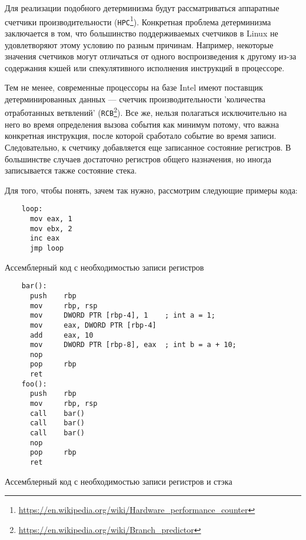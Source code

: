 Для реализации подобного детерминизма будут рассматриваться аппаратные счетчики производительности 
(\texttt{HPC}\footnote{\url{https://en.wikipedia.org/wiki/Hardware_performance_counter}}).
Конкретная проблема детерминизма заключается в том, что большинство поддерживаемых счетчиков в Linux 
не удовлетворяют этому условию по разным причинам. 
Например, некоторые значения счетчиков могут отличаться от одного воспроизведения к другому 
из-за содержания кэшей или спекулятивного исполнения инструкций в процессоре.

Тем не менее, современные процессоры на базе Intel имеют поставщик детерминированных данных — счетчик производительности 
'количества отработанных ветвлений'
(\texttt{RCB}\footnote{\url{https://en.wikipedia.org/wiki/Branch_predictor}}). 
Все же, нельзя полагаться исключительно на него во время определения вызова события как 
минимум потому, что важна конкретная инструкция, после которой сработало событие во время записи. 
Следовательно, к счетчику добавляется еще 
записанное состояние регистров. 
В большинстве случаев достаточно регистров общего назначения, но иногда записывается также состояние стека. 

Для того, чтобы понять, зачем так нужно, рассмотрим следующие примеры кода:

\begin{codelisting}[H]
  \begin{verbatim}
    loop:
      mov eax, 1
      mov ebx, 2
      inc eax
      jmp loop
  \end{verbatim}
  \caption{Ассемблерный код с необходимостью записи регистров}
  \label{lst:good-loop}
\end{codelisting}

\begin{codelisting}[H]
  \begin{verbatim}
    bar():
      push    rbp
      mov     rbp, rsp
      mov     DWORD PTR [rbp-4], 1    ; int a = 1;
      mov     eax, DWORD PTR [rbp-4]
      add     eax, 10
      mov     DWORD PTR [rbp-8], eax  ; int b = a + 10;
      nop
      pop     rbp
      ret
    foo():
      push    rbp
      mov     rbp, rsp
      call    bar()
      call    bar()
      call    bar()
      nop
      pop     rbp
      ret
  \end{verbatim}
  \caption{Ассемблерный код с необходимостью записи регистров и стэка}
  \label{lst:multiple-calls}
\end{codelisting}

